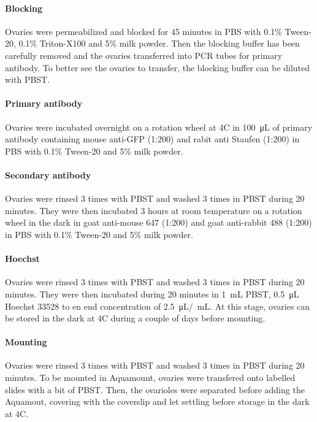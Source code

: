 \documentclass{article}
\begin{document}
\paragraph{Blocking} Ovaries were permeabilized and blocked for 45 minutes in PBS with 0.1\% Tween-20, 0.1\% Triton-X100 and 5\% milk powder. Then the blocking buffer has been carefully removed and the ovaries transferred into PCR tubes for primary antibody. To better see the ovaries to transfer, the blocking buffer can be diluted with PBST. 

\paragraph{Primary antibody} Ovaries were incubated overnight on a rotation wheel at 4\degree C in \SI{100}{\micro\liter} of primary antibody containing mouse anti-GFP (1:200) and rabit anti Staufen (1:200) in PBS with 0.1\% Tween-20 and 5\% milk powder. 

\paragraph{Secondary antibody} Ovaries were rinsed 3 times with PBST and washed 3 times in PBST during 20 minutes. They were then incubated 3 hours at room temperature on a rotation wheel in the dark in goat anti-mouse 647 (1:200) and goat anti-rabbit 488 (1:200) in PBS with 0.1\% Tween-20 and 5\% milk powder. 

\paragraph{Hoechst} Ovaries were rinsed 3 times with PBST and washed 3 times in PBST during 20 minutes. They were then incubated during 20 minutes in \SI{1}{\milli\liter} PBST, \SI{0.5}{\micro\liter} Hoechst 33528 to en end concentration of \SI{2.5}{\micro\liter}/\SI{}{\milli\liter}. At this stage, ovaries can be stored in the dark at 4\degree C during a couple of days before mounting.

\paragraph{Mounting} Ovaries were rinsed 3 times with PBST and washed 3 times in PBST during 20 minutes. To be mounted in Aquamount, ovaries were transfered onto labelled slides with a bit of PBST. Then, the ovarioles were separated before adding the Aquamout, covering with the coverslip and let settling before storage in the dark at 4\degree C.
\end{document}
